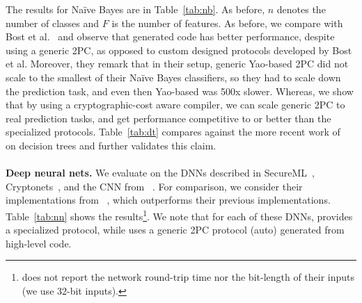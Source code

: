 The results for Na\"{i}ve Bayes are
in Table~\ref{tab:nb}. As before, $n$ denotes the number of classes and $F$ is the number of features.
As before, we compare with Bost et al.~\cite{shafindss} and observe that \tool generated code
has better performance, despite using a generic 2PC,
as opposed to custom designed protocols developed by Bost et
al. Moreover, they remark that in their setup, generic Yao-based 2PC
did not scale to the smallest of their Na\"{i}ve Bayes classifiers, so
they had to scale down the prediction task, and even then Yao-based \mpc
was 500x slower. Whereas, we show that by using a
cryptographic-cost aware compiler, we can scale generic 2PC to real
prediction tasks, and get performance competitive to or better than the
specialized protocols. Table~\ref{tab:dt} 
compares against the more recent work of~\cite{wu}
on decision trees and further validates this claim.
\\\\
\noindent\textbf{Deep neural nets.}
We evaluate \tool on the DNNs described in SecureML~\cite{secureml},
Cryptonets~\cite{cryptonets}, and the CNN from \minion~\cite{minionn}. For
comparison, we consider their implementations from
\minion~\cite{minionn}, which outperforms their previous
implementations. Table~\ref{tab:nn} shows the
results\footnote{\minion does not report the network round-trip time nor the bit-length of their inputs (we use $32$-bit inputs).}.
We note that for each of these DNNs, \minion provides a
specialized protocol, while \tool uses a generic 2PC protocol
(auto) generated from high-level code.

